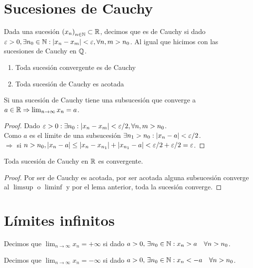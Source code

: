 \section{Sucesiones de Cauchy}

Dada una sucesión \({(x_n)}_{n \in \mathbb{N}} \subset \mathbb{R} \), decimos que es de Cauchy si dado \(\varepsilon > 0, \exists n_0 \in \mathbb{N} : |x_n - x_m| < \varepsilon, \forall n,m > n_0\). Al igual que hicimos con las sucesiones de Cauchy en \(\mathbb{Q} \).

\begin{enumerate}
  \item Toda sucesión convergente es de Cauchy
  \item Toda sucesión de Cauchy es acotada
\end{enumerate}

\begin{lemma}
  Si una sucesión de Cauchy tiene una subsucesión que converge a \(a \in \mathbb{R} \Rightarrow \lim_{n \to \infty} x_n = a\).
  \begin{proof}
    Dado \(\varepsilon > 0 : \exists n_0 : |x_n - x_m| < \varepsilon / 2, \forall n,m > n_0\). \\
    Como \(a\) es el límite de una subsucesión \(\exists n_1 > n_0 : |x_n - a| < \varepsilon / 2\). \\
    \(\Rightarrow \) si \(n > n_0, |x_n - a| \leq |x_n - x_{n_1}| + |x_{n_1} - a| < \varepsilon / 2 + \varepsilon / 2 = \varepsilon \).
  \end{proof}
\end{lemma}

\begin{theorem}
  Toda sucesión de Cauchy en \(\mathbb{R} \) es convergente.
  \begin{proof}
    Por ser de Cauchy es acotada, por ser acotada alguna subsucesión converge al \(\limsup\) o \(\liminf\) y por el lema anterior, toda la sucesión converge.
  \end{proof}
\end{theorem}

\section{Límites infinitos}

\begin{definition}
  Decimos que \(\lim_{n \to \infty} x_n = + \infty \) si dado \(a > 0\text{, } \exists n_0 \in \mathbb{N} : x_n > a \quad \forall n > n_0\).
\end{definition}

\begin{definition}
  Decimos que \(\lim_{n \to \infty} x_n = - \infty \) si dado \(a > 0\text{, } \exists n_0 \in \mathbb{N} : x_n < -a \quad \forall n > n_0\).
\end{definition}

